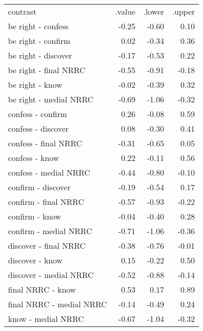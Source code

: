 \begin{longtable}{lrrr}
 contrast & .value & .lower & .upper \\ 
 be right - confess & -0.25 & -0.60 & 0.10 \\ 
  be right - confirm & 0.02 & -0.34 & 0.36 \\ 
  be right - discover & -0.17 & -0.53 & 0.22 \\ 
  be right - final NRRC & -0.55 & -0.91 & -0.18 \\ 
  be right - know & -0.02 & -0.39 & 0.32 \\ 
  be right - medial NRRC & -0.69 & -1.06 & -0.32 \\ 
  confess - confirm & 0.26 & -0.08 & 0.59 \\ 
  confess - discover & 0.08 & -0.30 & 0.41 \\ 
  confess - final NRRC & -0.31 & -0.65 & 0.05 \\ 
  confess - know & 0.22 & -0.11 & 0.56 \\ 
  confess - medial NRRC & -0.44 & -0.80 & -0.10 \\ 
  confirm - discover & -0.19 & -0.54 & 0.17 \\ 
  confirm - final NRRC & -0.57 & -0.93 & -0.22 \\ 
  confirm - know & -0.04 & -0.40 & 0.28 \\ 
  confirm - medial NRRC & -0.71 & -1.06 & -0.36 \\ 
  discover - final NRRC & -0.38 & -0.76 & -0.01 \\ 
  discover - know & 0.15 & -0.22 & 0.50 \\ 
  discover - medial NRRC & -0.52 & -0.88 & -0.14 \\ 
  final NRRC - know & 0.53 & 0.17 & 0.89 \\ 
  final NRRC - medial NRRC & -0.14 & -0.49 & 0.24 \\ 
  know - medial NRRC & -0.67 & -1.04 & -0.32 \\ 
  \end{longtable}

